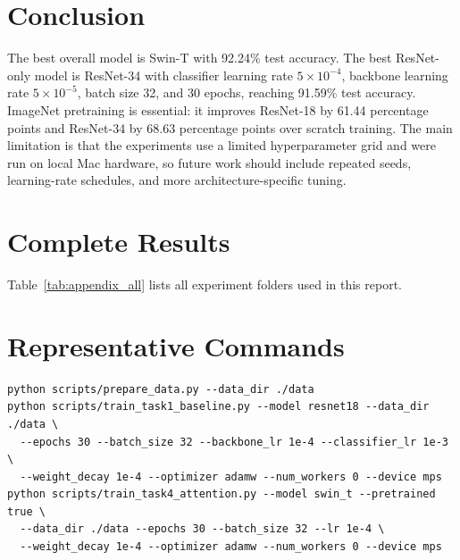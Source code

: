 \documentclass{article}
\begin{document}
\section{Conclusion}

The best overall model is Swin-T with 92.24\% test accuracy. The best ResNet-only model is ResNet-34 with classifier learning rate $5\times10^{-4}$, backbone learning rate $5\times10^{-5}$, batch size 32, and 30 epochs, reaching 91.59\% test accuracy. ImageNet pretraining is essential: it improves ResNet-18 by 61.44 percentage points and ResNet-34 by 68.63 percentage points over scratch training. The main limitation is that the experiments use a limited hyperparameter grid and were run on local Mac hardware, so future work should include repeated seeds, learning-rate schedules, and more architecture-specific tuning.

\appendix

\section{Complete Results}

Table~\ref{tab:appendix_all} lists all experiment folders used in this report.

\begin{table}[h]
  \caption{Complete experiment summary.}
  \label{tab:appendix_all}
  \centering
  \tiny
  
\end{table}

\section{Representative Commands}

\begin{verbatim}
python scripts/prepare_data.py --data_dir ./data
python scripts/train_task1_baseline.py --model resnet18 --data_dir ./data \
  --epochs 30 --batch_size 32 --backbone_lr 1e-4 --classifier_lr 1e-3 \
  --weight_decay 1e-4 --optimizer adamw --num_workers 0 --device mps
python scripts/train_task4_attention.py --model swin_t --pretrained true \
  --data_dir ./data --epochs 30 --batch_size 32 --lr 1e-4 \
  --weight_decay 1e-4 --optimizer adamw --num_workers 0 --device mps
\end{verbatim}



\end{document}
